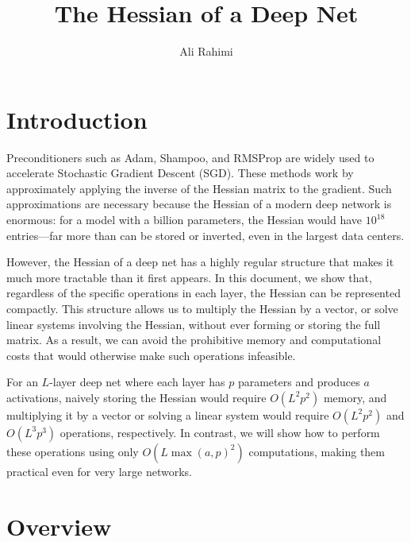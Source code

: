\documentclass{article}
\title{The Hessian of a Deep Net}
\author{Ali Rahimi}
\begin{document}
\maketitle

\section{Introduction}

Preconditioners such as Adam, Shampoo, and RMSProp are widely used to
accelerate Stochastic Gradient Descent (SGD). These methods work by
approximately applying the inverse of the Hessian matrix to the gradient. Such
approximations are necessary because the Hessian of a modern deep network is
enormous: for a model with a billion parameters, the Hessian would have
$10^{18}$ entries---far more than can be stored or inverted, even in the
largest data centers.

However, the Hessian of a deep net has a highly regular structure that makes it
much more tractable than it first appears. In this document, we show that,
regardless of the specific operations in each layer, the Hessian can be
represented compactly. This structure allows us to multiply the Hessian by a
vector, or solve linear systems involving the Hessian, without ever forming or
storing the full matrix. As a result, we can avoid the prohibitive memory and
computational costs that would otherwise make such operations infeasible.

For an $L$-layer deep net where each layer has $p$ parameters and produces $a$
activations, naively storing the Hessian would require $O(L^2p^2)$ memory, and
multiplying it by a vector or solving a linear system would require $O(L^2p^2)$
and $O(L^3p^3)$ operations, respectively. In contrast, we will show how to
perform these operations using only $O(L \max(a, p)^2)$ computations, making
them practical even for very large networks.

\section{Overview}
\end{document}

